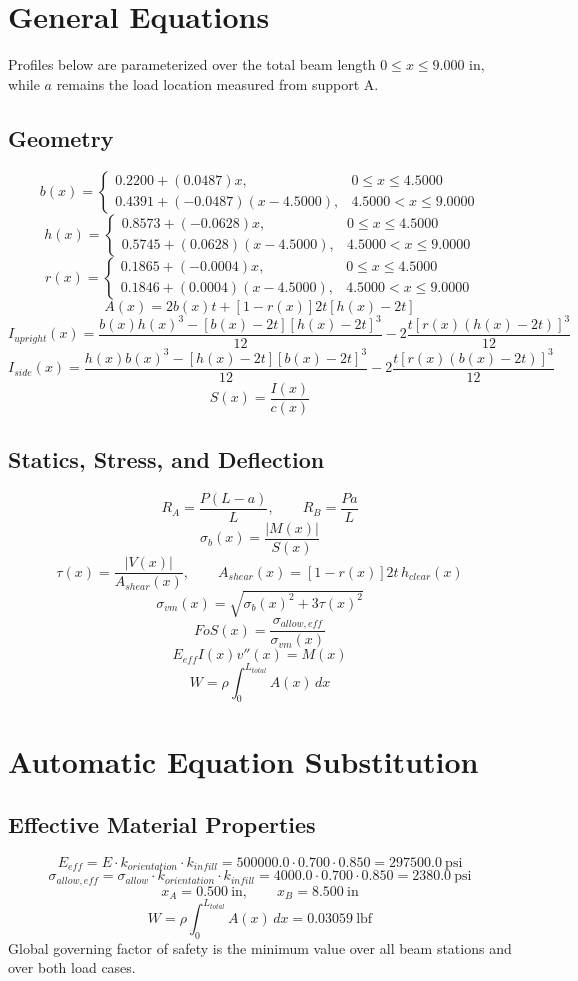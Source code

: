 \documentclass[11pt]{article}
\begin{document}
\section*{General Equations}
Profiles below are parameterized over the total beam length $0 \le x \le 9.000$ in, while $a$ remains the load location measured from support A.
\subsection*{Geometry}
\[
b(x)=\begin{cases}0.2200 + (0.0487)x, & 0 \le x \le 4.5000\\0.4391 + (-0.0487)(x-4.5000), & 4.5000 < x \le 9.0000\end{cases}
\]
\[
h(x)=\begin{cases}0.8573 + (-0.0628)x, & 0 \le x \le 4.5000\\0.5745 + (0.0628)(x-4.5000), & 4.5000 < x \le 9.0000\end{cases}
\]
\[
r(x)=\begin{cases}0.1865 + (-0.0004)x, & 0 \le x \le 4.5000\\0.1846 + (0.0004)(x-4.5000), & 4.5000 < x \le 9.0000\end{cases}
\]
\[
A(x)=2b(x)t+[1-r(x)]2t[h(x)-2t]
\]
\[
I_{upright}(x)=\frac{b(x)h(x)^3-[b(x)-2t][h(x)-2t]^3}{12}-2\frac{t[r(x)(h(x)-2t)]^3}{12}
\]
\[
I_{side}(x)=\frac{h(x)b(x)^3-[h(x)-2t][b(x)-2t]^3}{12}-2\frac{t[r(x)(b(x)-2t)]^3}{12}
\]
\[
S(x)=\frac{I(x)}{c(x)}
\]

\subsection*{Statics, Stress, and Deflection}
\[
R_A=\frac{P(L-a)}{L}, \qquad R_B=\frac{Pa}{L}
\]
\[
\sigma_b(x)=\frac{|M(x)|}{S(x)}
\]
\[
\tau(x)=\frac{|V(x)|}{A_{shear}(x)}, \qquad A_{shear}(x)=[1-r(x)]2t\,h_{clear}(x)
\]
\[
\sigma_{vm}(x)=\sqrt{\sigma_b(x)^2+3\tau(x)^2}
\]
\[
FoS(x)=\frac{\sigma_{allow,eff}}{\sigma_{vm}(x)}
\]
\[
E_{eff}I(x)v''(x)=M(x)
\]
\[
W=\rho\int_0^{L_{total}} A(x)\,dx
\]

\section*{Automatic Equation Substitution}
\subsection*{Effective Material Properties}
\[E_{eff} = E \cdot k_{orientation} \cdot k_{infill} = 500000.0 \cdot 0.700 \cdot 0.850 = 297500.0\ \mathrm{psi}\]
\[\sigma_{allow,eff} = \sigma_{allow} \cdot k_{orientation} \cdot k_{infill} = 4000.0 \cdot 0.700 \cdot 0.850 = 2380.0\ \mathrm{psi}\]
\[x_A = 0.500\ \mathrm{in}, \qquad x_B = 8.500\ \mathrm{in}\]
\[W = \rho \int_0^{L_{total}} A(x)\,dx = 0.03059\ \mathrm{lbf}\]
Global governing factor of safety is the minimum value over all beam stations and over both load cases.
\end{document}
